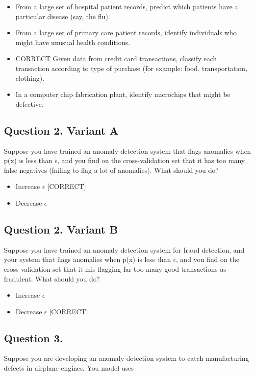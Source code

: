 \documentclass[11pt]{article} %
\begin{document}
\begin{itemize}
	\item From a large set of hospital patient records, predict which patients have a particular disease (say, the flu).
	\item From a large set of primary care patient records, identify individuals who might have unusual health conditions.
	\item CORRECT
	Given data from credit card transactions, classify each transaction according to type of purchase (for example: food, transportation, clothing).
	\item 
	In a computer chip fabrication plant, identify microchips that might be defective.
\end{itemize}

\subsection*{Question 2. Variant A}
Suppose you have trained an anomaly detection system that flags anomalies when p(x) is less than $\epsilon$, and you find on the cross-validation set that it has 
too many false negatives (failing to flag a lot of anomalies). What should you do?


\begin{itemize}
	\item Increase $\epsilon$ [CORRECT]
	\item Decrease $\epsilon$
\end{itemize}

\subsection*{Question 2. Variant B}
Suppose you have trained an anomaly detection system for fraud detection, and your system that flags 
anomalies when p(x) is less than $\epsilon$, and you find on the 
cross-validation set that it mis-flagging far too many good transactions as fradulent. What should you do?

\begin{itemize}
	\item Increase $\epsilon$ 
	\item Decrease $\epsilon$ [CORRECT]
\end{itemize}

\subsection*{Question 3. }
Suppose you are developing an anomaly detection system to catch manufacturing defects in airplane engines. You model uses
\end{document}
